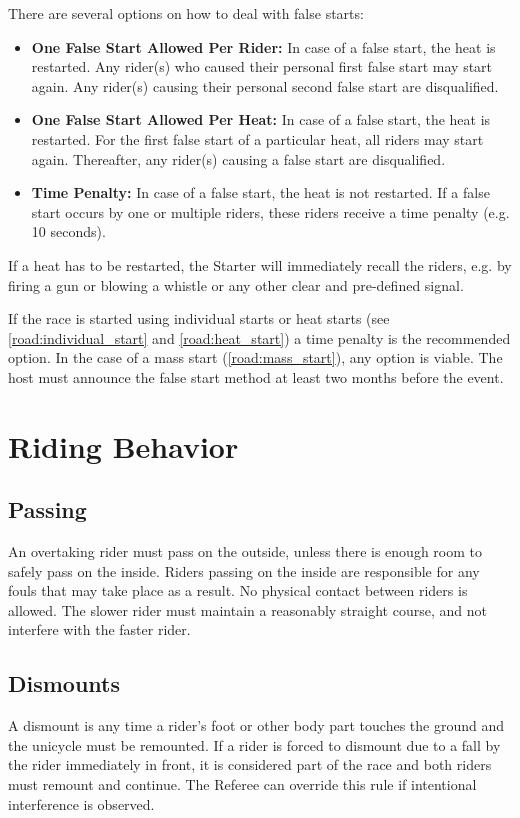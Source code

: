 There are several options on how to deal with false starts:
\begin{itemize}
\item \textbf{One False Start Allowed Per Rider:}
In case of a false start, the heat is restarted.
Any rider(s) who caused their personal first false start may start again.
Any rider(s) causing their personal second false start are disqualified.
\item \textbf{One False Start Allowed Per Heat:} 
In case of a false start, the heat is restarted.
For the first false start of a particular heat, all riders may start again.
Thereafter, any rider(s) causing a false start are disqualified.
\item \textbf{Time Penalty:}
In case of a false start, the heat is not restarted.
If a false start occurs by one or multiple riders, these riders receive a time penalty (e.g. 10 seconds).
\end{itemize}
If a heat has to be restarted, the Starter will immediately recall the riders, e.g. by firing a gun or blowing a whistle or any other clear and pre-defined signal.

If the race is started using individual starts or heat starts (see \ref{road:individual_start} and \ref{road:heat_start}) a time penalty is the recommended option.
In the case of a mass start (\ref{road:mass_start}), any option is viable.
The host must announce the false start method at least two months before the event.

\section{Riding Behavior}

\subsection{Passing}
An overtaking rider must pass on the outside, unless there is enough room to safely pass on the inside.
Riders passing on the inside are responsible for any fouls that may take place as a result.
No physical contact between riders is allowed.
The slower rider must maintain a reasonably straight course, and not interfere with the faster rider.

\subsection{Dismounts}
A dismount is any time a rider’s foot or other body part touches the ground and the unicycle must be remounted.
If a rider is forced to dismount due to a fall by the rider immediately in front, it is considered part of the race and both riders must remount and continue.
The Referee can override this rule if intentional interference is observed.

